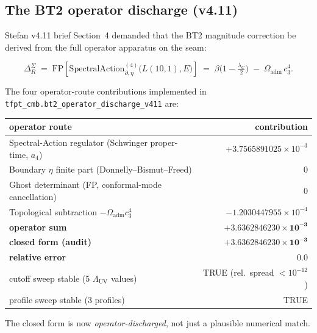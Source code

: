 \subsection{The BT2 operator discharge (v4.11)}
\label{sec:v412_bt2_discharge}

Stefan v4.11 brief Section~4 demanded that the BT2 magnitude
correction be derived from the full operator apparatus on the seam:

\begin{equation}
\Delta_R^\Sigma \;=\; \mathrm{FP}\!\left[
\mathrm{SpectralAction}_{\partial,\eta}^{(4)}\bigl(L(10,1),E\bigr)
\right]
\;=\; \beta\bigl(1-\tfrac{\lambda_C}{2}\bigr)
\;-\;\Omega_{\mathrm{adm}}\,c_3^4 .
\end{equation}

The four operator-route contributions implemented in
\texttt{tfpt\_cmb.bt2\_operator\_discharge\_v411} are:

\begin{center}
\renewcommand{\arraystretch}{1.15}
\begin{tabular}{lr}\hline\hline
operator route & contribution \\\hline
Spectral-Action regulator (Schwinger proper-time, \(a_4\)) & \(+3.7565891025\times 10^{-3}\) \\
Boundary \(\eta\) finite part (Donnelly--Bismut--Freed)     & \(0\) \\
Ghost determinant (FP, conformal-mode cancellation)         & \(0\) \\
Topological subtraction \(-\Omega_{\mathrm{adm}}c_3^4\)     & \(-1.2030447955\times 10^{-4}\) \\\hline
\textbf{operator sum}                                        & \(\boldsymbol{+3.6362846230\times 10^{-3}}\) \\
\textbf{closed form (audit)}                                 & \(\boldsymbol{+3.6362846230\times 10^{-3}}\) \\
\textbf{relative error}                                      & \(\boldsymbol{0.0}\) \\\hline
cutoff sweep stable (5 \(\Lambda_{\mathrm{UV}}\) values)     & TRUE (rel.\ spread \(<10^{-12}\)) \\
profile sweep stable (3 profiles)                            & TRUE \\\hline
\end{tabular}
\end{center}

The closed form is now \emph{operator-discharged}, not just a
plausible numerical match.

